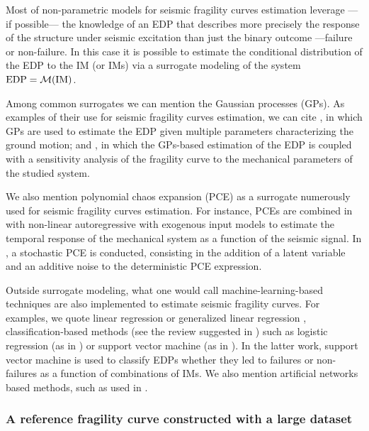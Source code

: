 Most of non-parametric models for seismic fragility curves estimation leverage ---if possible--- the knowledge of an EDP that describes more precisely the response of the structure under seismic excitation than just the binary outcome ---failure or non-failure.
In this case it is possible to estimate the conditional distribution of the EDP to the IM (or IMs) via a surrogate modeling of the system $\text{EDP}=\mathcal{M}(\text{IM})$.

Among common surrogates we can mention the Gaussian processes (GPs). As examples of their use for seismic fragility curves estimation, we can cite \cite{gidaris_kriging_2015}, in which GPs are used to estimate the EDP given multiple parameters characterizing the ground motion; and \cite{gauchy_uncertainty_2024}, in which the GPs-based estimation of the EDP is coupled with a sensitivity analysis of the fragility curve to the mechanical parameters of the studied system.

We also mention polynomial chaos expansion (PCE) as a surrogate numerously used for seismic fragility curves estimation. For instance, PCEs are combined in \cite{mai_surrogate_2016} with non-linear autoregressive with exogenous input models to estimate the temporal response of the mechanical system as a function of the seismic signal.
In \cite{zhu_seismic_2023}, a stochastic PCE is conducted, consisting in the addition of a latent variable and an additive noise to the deterministic PCE expression.

Outside surrogate modeling, what one would call machine-learning-based techniques are also implemented to estimate seismic fragility curves.
For examples, we quote linear regression or generalized linear regression \citep{lallemant_statistical_2015}, classification-based methods (see the review suggested in \cite{kiani_application_2019}) such as  logistic regression (as in \cite{bernier_fragility_2019}) or support vector machine (as in \cite{sainct_efficient_2020}). In the latter work, support vector machine is used to classify EDPs whether they led to failures or non-failures as a function of combinations of IMs.
We also mention artificial networks based methods, such as used in \cite{mitropoulou_developing_2011,wang_seismic_2018}.
 


\subsubsection{A reference fragility curve constructed with a large dataset}

